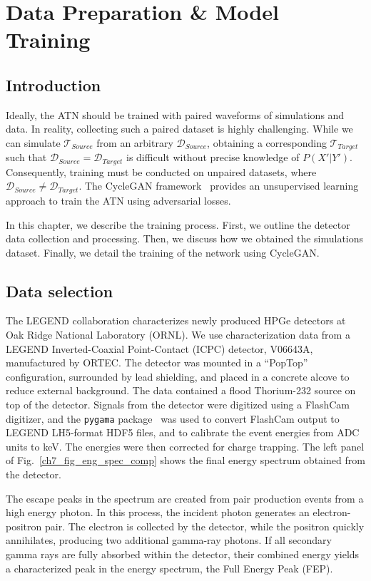 \chapter{Data Preparation \& Model Training} \label{chap:training}

\section{Introduction}
Ideally, the ATN should be trained with paired waveforms of simulations and data. In reality, collecting such a paired dataset is highly challenging. While we can simulate $\mathcal{T}_{Source}$ from an arbitrary $\mathcal{D}_{Source}$, obtaining a corresponding $\mathcal{T}_{Target}$ such that $\mathcal{D}_{Source} = \mathcal{D}_{Target}$ is difficult without precise knowledge of $P(X'|Y')$. Consequently, training must be conducted on unpaired datasets, where $\mathcal{D}_{Source} \neq \mathcal{D}_{Target}$. The CycleGAN framework~\cite{CycleGAN} provides an unsupervised learning approach to train the ATN using adversarial losses.

In this chapter, we describe the training process. First, we outline the detector data collection and processing. Then, we discuss how we obtained the simulations dataset. Finally, we detail the training of the network using CycleGAN.

\section{Data selection}

The LEGEND collaboration characterizes newly produced HPGe detectors at Oak Ridge National Laboratory (ORNL). We use characterization data from a LEGEND Inverted-Coaxial Point-Contact (ICPC) detector, V06643A, manufactured by ORTEC. The detector was mounted in a “PopTop” configuration, surrounded by lead shielding, and placed in a concrete alcove to reduce external background. The data contained a flood Thorium-232 source on top of the detector. Signals from the detector were digitized using a FlashCam digitizer, and the \texttt{pygama} package~\cite{pygama} was used to convert FlashCam output to LEGEND LH5-format HDF5 files, and to calibrate the event energies from ADC units to keV. The energies were then corrected for charge trapping. The left panel of Fig.~\ref{ch7_fig_eng_spec_comp} shows the final energy spectrum obtained from the detector.


The escape peaks in the spectrum are created from pair production events from a high energy photon. In this process, the incident photon generates an electron-positron pair. The electron is collected by the detector, while the positron quickly annihilates, producing two additional gamma-ray photons. If all secondary gamma rays are fully absorbed within the detector, their combined energy yields a characterized peak in the energy spectrum, the Full Energy Peak (FEP).


